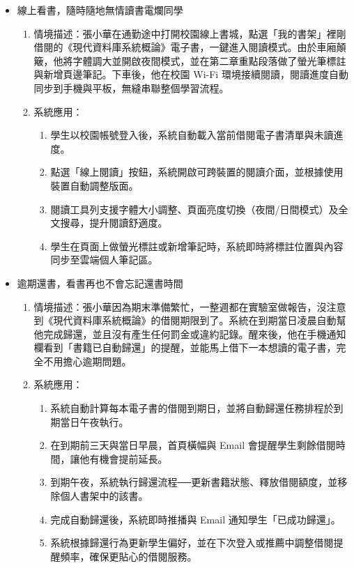 \begin{itemize}
    \item 線上看書，隨時隨地無情讀書電爛同學
        \begin{enumerate}
            \item 情境描述：張小華在通勤途中打開校園線上書城，點選「我的書架」裡剛借閱的《現代資料庫系統概論》電子書，一鍵進入閱讀模式。由於車廂顛簸，他將字體調大並開啟夜間模式，並在第二章重點段落做了螢光筆標註與新增頁邊筆記。下車後，他在校園 Wi-Fi 環境接續閱讀，閱讀進度自動同步到手機與平板，無縫串聯整個學習流程。
            \item 系統應用：
                \begin{enumerate}
                    \item 學生以校園帳號登入後，系統自動載入當前借閱電子書清單與未讀進度。
                    \item 點選「線上閱讀」按鈕，系統開啟可跨裝置的閱讀介面，並根據使用裝置自動調整版面。
                    \item 閱讀工具列支援字體大小調整、頁面亮度切換（夜間/日間模式）及全文搜尋，提升閱讀舒適度。
                    \item 學生在頁面上做螢光標註或新增筆記時，系統即時將標註位置與內容同步至雲端個人筆記區。
                \end{enumerate}
        \end{enumerate}
         
    \item 逾期還書，看書再也不會忘記還書時間
        \begin{enumerate}
            \item 情境描述：張小華因為期末準備繁忙，一整週都在實驗室做報告，沒注意到《現代資料庫系統概論》的借閱期限到了。系統在到期當日凌晨自動幫他完成歸還，並且沒有產生任何罰金或違約記錄。醒來後，他在手機通知欄看到「書籍已自動歸還」的提醒，並能馬上借下一本想讀的電子書，完全不用擔心逾期問題。
            \item 系統應用：
                \begin{enumerate}
                    \item 系統自動計算每本電子書的借閱到期日，並將自動歸還任務排程於到期當日午夜執行。
                    \item 在到期前三天與當日早晨，首頁橫幅與 Email 會提醒學生剩餘借閱時間，讓他有機會提前延長。
                    \item 到期午夜，系統執行歸還流程──更新書籍狀態、釋放借閱額度，並移除個人書架中的該書。
                    \item 完成自動歸還後，系統即時推播與 Email 通知學生「已成功歸還」。
                    \item 系統根據歸還行為更新學生偏好，並在下次登入或推薦中調整借閱提醒頻率，確保更貼心的借閱服務。
                \end{enumerate}
        \end{enumerate}
\end{itemize}